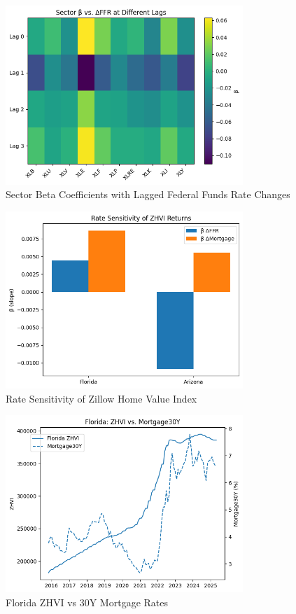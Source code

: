 \documentclass[12pt, stu, abstract]{apa7}
\begin{document}
\begin{appendices}
\begin{figure}[htbp]
    \centering
    \includegraphics[width=0.8\textwidth]{../figs/sector_beta_vs_ffr_lagged.png}
    \caption{Sector Beta Coefficients with Lagged Federal Funds Rate Changes}
    \label{fig:sector_lagged}
\end{figure}

\begin{figure}[htbp]
    \centering
    \includegraphics[width=0.8\textwidth]{../figs/rate_sens_zhvi.png}
    \caption{Rate Sensitivity of Zillow Home Value Index}
    \label{fig:zhvi_sens}
\end{figure}

\begin{figure}[htbp]
    \centering
    \includegraphics[width=0.8\textwidth]{../figs/fl_zhvi_vs_mort.png}
    \caption{Florida ZHVI vs 30Y Mortgage Rates}
    \label{fig:fl_zhvi}
\end{figure}


\end{appendices}
\end{document}
